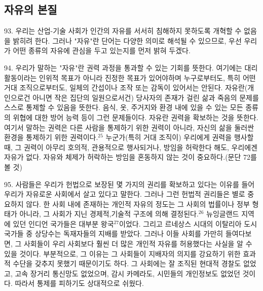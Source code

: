 \documentclass[11pt,a4paper]{article}
\begin{document}
\begin{multicols}{2}
\section*{자유의 본질} 
93. 우리는 산업-기술 사회가 인간의 자유를 서서히 침해하지 못하도록 개혁할 수 없음을 밝히려 한다.  그러나 "자유"란 단어는 다양한 의미로 해석될 수 있으므로, 우선 우리가 어떤 종류의 자유에 관심을 두고  있는지를 먼저 밝혀 두겠다. 


94. 우리가 말하는 "자유"란 권력 과정을 통과할 수 있는 기회를 뜻한다. 여기에는 대리 활동이라는  인위적 목표가 아니라 진정한 목표가 있어야하며 누구로부터도, 특히 어떤 거대 조직으로부터도, 일체의  간섭이나 조작 또는 감독이 있어서는 안된다. 자유란(개인으로건 아니면 작은 집단의 일원으로서건)  당사자의 존재가 걸린 삶과 죽음의 문제를 스스로 통제할 수 있음을 뜻한다. 음식, 옷, 주거지와 환경 내에 있을 수 있는 모든 종류의 위협에 대한 방어 능력 등이 그런 문제들이다. 자유란 권력을 확보하는 것을  뜻한다. 여기서 말하는 권력은 다른 사람을 통제하기 위한 권력이 아니라, 자신의 삶을 둘러싼 환경을  통제하기 위한 권력이다.\hyperlink{25}{$^{25}$} 누군가(특히 거대 조직이) 우리에게 권력을 행사할 때, 그 권력이 아무리  호의적, 관용적으로 행사되거나, 방임을 허락한다 해도, 우리에겐 자유가 없다. 자유와 체제가 허락하는  방임을 혼동하지 않는 것이 중요하다.(문단 72를 볼 것) 


95. 사람들은 우리가 헌법으로 보장된 몇 가지의 권리를 확보하고 있다는 이유를 들어 우리가 자유로운  사회에서 살고 있다고 말한다. 그러나 그런 헌법적 권리들은 별로 중요하지 않다. 한 사회 내에 존재하는  개인적 자유의 정도는 그 사회의 법률이나 정부 형태가 아니라, 그 사회가 지닌 경제적,기술적 구조에  의해 결정된다.\hyperlink{26}{$^{26}$} 뉴잉글랜드 지역에 있던 인디언 국가들은 대부분 왕국\hyperlink{27}{$^{27}$}이었다. 그리고 르네상스 시대의 이탈리아 도시 국가들 중 상당수는 독재자들의 지배를 받았다. 그러나 이들 사회를 가만히 들여다보면, 그 사회들이 우리 사회보다 훨씬 더 많은 개인적 자유를 허용했다는 사실을 알 수 있을 것이다. 부분적으로,  그 이유는 그 사회들이 지배자의 의지를 강요하기 위한 효과적 수단을 갖추지 못했기 때문이기도 하다. 그 사회에는 잘 조직된 현대적 경찰도 없었고, 고속 장거리 통신망도 없었으며, 감시 카메라도, 시민들의  개인정보도 없었던 것이다. 따라서 통제를 피하기도 상대적으로 쉬웠다.  



\end{multicols}
\end{document}
